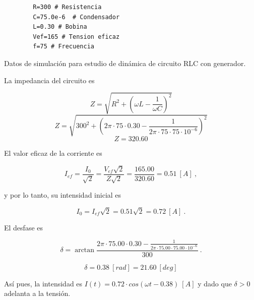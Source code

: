 \documentclass[journal]{IEEEtran}
\newenvironment{code}{\captionsetup{type=listing}}{\par\addvspace{\baselineskip}}
\begin{document}
\bigskip
\newpage

\begin{code}
    \begin{verbatim}
        R=300 # Resistencia
        C=75.0e-6  # Condensador
        L=0.30 # Bobina
        Vef=165 # Tension eficaz
        f=75 # Frecuencia
    \end{verbatim}
    \caption{Datos de simulación para estudio de dinámica de circuito RLC con generador.}
    \label{listing:datos_rlccongen}
\end{code}

La impedancia del circuito es

\begin{equation}
Z = \sqrt{R^2 + (\omega L - \frac{1}{\omega C})^2}
\end{equation}
\begin{equation}
Z=\sqrt{300^2 + (2\pi\cdot 75\cdot 0.30 - \frac{1}{2\pi\cdot 75\cdot 75\cdot 10^{-6}})^2}
\end{equation}
\begin{equation}
Z = 320.60
\end{equation}

El valor eficaz de la corriente es

\begin{equation}
I_{ef} = \frac{I_0}{\sqrt{2}} = \frac{V_{ef}\sqrt{2}}{Z\sqrt{2}} = \frac{165.00}{320.60} = 0.51~[A]~,
\end{equation}

y por lo tanto, su intensidad inicial es

\begin{equation}
I_0 = I_{ef} \sqrt{2} = 0.51 \sqrt{2} = 0.72~[A]~.
\end{equation}

El desfase es

\begin{equation}
\delta = \arctan{\frac{2 \pi \cdot 75.00 \cdot 0.30 - \frac{1}{2 \pi \cdot 75.00 \cdot 75.00\cdot 10^{-6}}}{300}}~.
\end{equation}

\begin{equation}
\delta = 0.38~[rad] = 21.60~[deg]
\end{equation}

Así pues, la intensidad es $I(t) = 0.72\cdot cos(\omega t - 0.38)~[A]$ y dado que $\delta > 0$ adelanta a la tensión.
\end{document}
